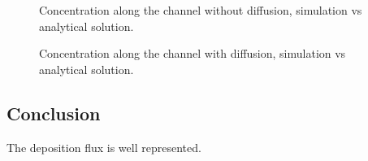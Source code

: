 \begin{figure}[h]
 \centering
 \caption{Concentration along the channel without diffusion,
  simulation vs analytical solution.}
 \label{fig:gaia:depot:nodiff}
\end{figure}

\begin{figure}[h]
 \centering
 \caption{Concentration along the channel with diffusion,
  simulation vs analytical solution.}
 \label{fig:gaia:depot:diff}
\end{figure}

\subsection{Conclusion}

The deposition flux is well represented.
